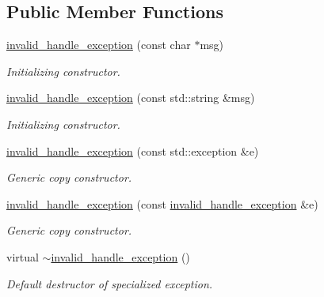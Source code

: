 \subsection*{Public Member Functions}
\begin{DoxyCompactItemize}
\item 
\hyperlink{class_d_d4hep_1_1invalid__handle__exception_a89d95e32d6ca7f17d77b4f44fa7ecc7a}{invalid\_\-handle\_\-exception} (const char $\ast$msg)
\begin{DoxyCompactList}\small\item\em Initializing constructor. \item\end{DoxyCompactList}\item 
\hyperlink{class_d_d4hep_1_1invalid__handle__exception_a6ed4463753276b8dc70197302a5ca085}{invalid\_\-handle\_\-exception} (const std::string \&msg)
\begin{DoxyCompactList}\small\item\em Initializing constructor. \item\end{DoxyCompactList}\item 
\hyperlink{class_d_d4hep_1_1invalid__handle__exception_a9f983790d122d9b8b81c1147a99a3e01}{invalid\_\-handle\_\-exception} (const std::exception \&e)
\begin{DoxyCompactList}\small\item\em Generic copy constructor. \item\end{DoxyCompactList}\item 
\hyperlink{class_d_d4hep_1_1invalid__handle__exception_a4216bbb641a3d4bb30d71f24a835da51}{invalid\_\-handle\_\-exception} (const \hyperlink{class_d_d4hep_1_1invalid__handle__exception}{invalid\_\-handle\_\-exception} \&e)
\begin{DoxyCompactList}\small\item\em Generic copy constructor. \item\end{DoxyCompactList}\item 
virtual \hyperlink{class_d_d4hep_1_1invalid__handle__exception_aaf1f7c315a89fbbe7c545eca6a27b9d8}{$\sim$invalid\_\-handle\_\-exception} ()
\begin{DoxyCompactList}\small\item\em Default destructor of specialized exception. \item\end{DoxyCompactList}\end{DoxyCompactItemize}



